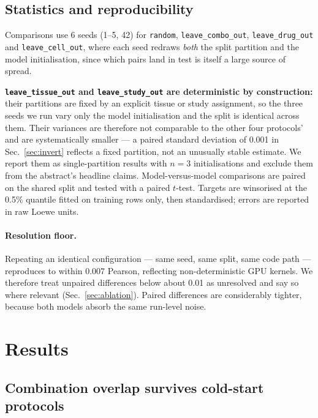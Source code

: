 \documentclass{ws-procs11x85}
\begin{document}
\subsection{Statistics and reproducibility}\label{sec:stats}

Comparisons use 6 seeds (1--5, 42) for {\tt random}, {\tt leave\_combo\_out},
{\tt leave\_drug\_out} and {\tt leave\_cell\_out}, where each seed redraws
\emph{both} the split partition and the model initialisation, since which pairs
land in test is itself a large source of spread.

\textbf{{\tt leave\_tissue\_out} and {\tt leave\_study\_out} are deterministic by
construction:} their partitions are fixed by an explicit tissue or study
assignment, so the three seeds we run vary only the model initialisation and the
split is identical across them. Their variances are therefore not comparable to
the other four protocols' and are systematically smaller --- a paired standard
deviation of 0.001 in Sec.~\ref{sec:invert} reflects a fixed partition, not an
unusually stable estimate. We report them as single-partition results with
$n = 3$ initialisations and exclude them from the abstract's headline claims. Model-versus-model comparisons are paired on the shared
split and tested with a paired $t$-test. Targets are winsorised at the 0.5\%
quantile fitted on training rows only, then standardised; errors are reported in
raw Loewe units.

\paragraph{Resolution floor.} Repeating an identical configuration --- same seed,
same split, same code path --- reproduces to within 0.007 Pearson, reflecting
non-deterministic GPU kernels. We therefore treat unpaired differences below
about 0.01 as unresolved and say so where relevant (Sec.~\ref{sec:ablation}).
Paired differences are considerably tighter, because both models absorb the same
run-level noise.

\section{Results}

\subsection{Combination overlap survives cold-start protocols}\label{sec:overlap}
\end{document}

